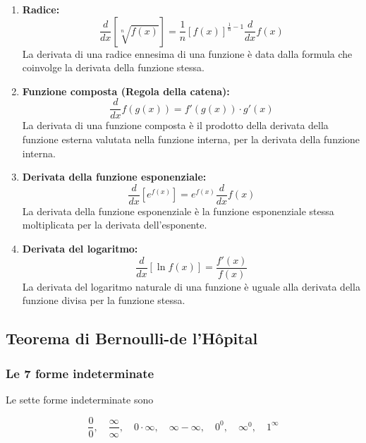 \documentclass{article}
\begin{document}
\begin{enumerate}
    \item \textbf{Radice:}
    \begin{equation*}
        \frac{d}{dx} \left[ \sqrt[n]{f(x)} \right] = \frac{1}{n} \left[ f(x) \right]^{\frac{1}{n} - 1} \frac{d}{dx} f(x)
    \end{equation*}
    La derivata di una radice ennesima di una funzione è data dalla formula che coinvolge la derivata della funzione stessa.
    
    \item \textbf{Funzione composta (Regola della catena):}
    \begin{equation*}
        \frac{d}{dx} f(g(x)) = f'(g(x)) \cdot g'(x)
    \end{equation*}
    La derivata di una funzione composta è il prodotto della derivata della funzione esterna valutata nella funzione interna, per la derivata della funzione interna.
        
    \item \textbf{Derivata della funzione esponenziale:}
    \begin{equation*}
        \frac{d}{dx} [e^{f(x)}] = e^{f(x)} \frac{d}{dx} f(x)
    \end{equation*}
    La derivata della funzione esponenziale è la funzione esponenziale stessa moltiplicata per la derivata dell'esponente.
    
    \item \textbf{Derivata del logaritmo:}
    \begin{equation*}
        \frac{d}{dx} [\ln f(x)] = \frac{f'(x)}{f(x)}
    \end{equation*}
    La derivata del logaritmo naturale di una funzione è uguale alla derivata della funzione divisa per la funzione stessa.
\end{enumerate}

\newpage

\subsection{Teorema di Bernoulli-de l'Hôpital}

\subsubsection{Le 7 forme indeterminate}

Le sette forme indeterminate sono
\begin{center}
    \[
        \frac{0}{0}, \quad
        \frac{\infty}{\infty}, \quad
        0 \cdot \infty, \quad
        \infty - \infty, \quad
        0^0, \quad
        \infty^0, \quad
        1^\infty
    \]
\end{center}
\end{document}
